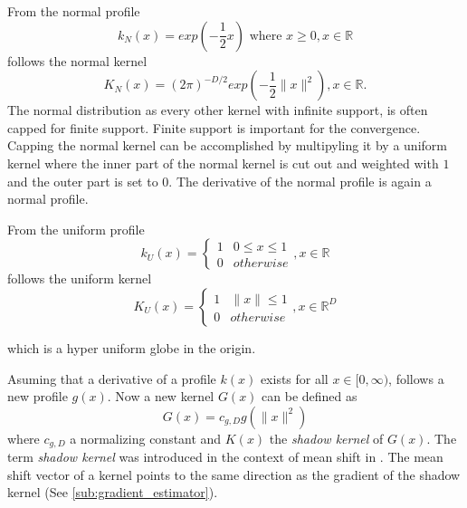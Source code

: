 From the normal profile
\begin{equation}\label{eq:nml}
	k_N(x) = exp \left( - \frac{1}{2} x \right) \textrm{ where } x \geq 0, x \in \mathbb{R}
\end{equation}
follows the normal kernel
\begin{equation}\label{eq:nmlk}
	K_N(x) = (2\pi)^{-D/2}exp\left( -\frac{1}{2} \lVert x \rVert^2 \right), x \in \mathbb{R}.
\end{equation}
The normal distribution as every other kernel with infinite support, is often
capped for finite support. Finite support is important for the convergence. Capping
the normal kernel can be accomplished by multipyling it by a uniform kernel where
the inner part of the normal kernel is cut out and weighted with $1$ and the 
outer part is set to $0$. The derivative of the normal profile is again a 
normal profile.

From the uniform profile 
\begin{equation}\label{eq:unf}
	k_U(x) = \begin{cases}
				1 &  0 \leq x \leq 1\\
				0 & \mathit{otherwise}
		\end{cases}, x \in \mathbb{R}
\end{equation}
follows the uniform kernel
\begin{equation}\label{eq:unfk}
	K_U(x) = \begin{cases}
				1 &  \lVert x \rVert  \leq 1\\
				0 & \mathit{otherwise}
		\end{cases}, x \in \mathbb{R}^D
\end{equation}

which is a {\color{iRed}hyper uniform globe} in the origin. 

Asuming that a derivative of a profile $k(x)$ exists for all $x \in [0, \infty)$, 
follows a new profile $g(x)$. Now a new kernel $G(x)$ can be defined as 
\begin{equation}\label{eq:shadowk}
	G(x) = c_{g,D}g(\lVert x \rVert^2)
\end{equation}
where $c_{g,D}$ a normalizing constant and $K(x)$ the \emph{shadow kernel} of 
$G(x)$. The term \emph{shadow kernel} was introduced in the context of mean 
shift in \citep{citeulike:2522867}. The mean shift vector of a kernel points to 
the same direction as the gradient of the shadow kernel (See \autoref{sub:gradient_estimator}). 



